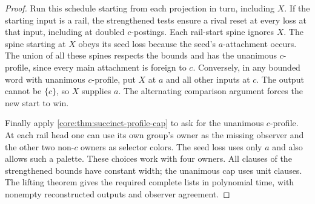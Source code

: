 \begin{proof}
Run this schedule starting from each projection in turn, including
$X$. If the starting input is a rail, the strengthened tests ensure
a rival reset at every loss at that input, including at doubled
$c$-postings. Each rail-start spine ignores $X$. The spine starting
at $X$ obeys its seed loss because the seed's $a$-attachment occurs.
The union of all these spines respects the bounds and has the
unanimous $c$-profile, since every main attachment is foreign to $c$.
Conversely, in any bounded word with unanimous $c$-profile,
put $X$ at $a$ and all other inputs at $c$. The output cannot be
$\{c\}$, so $X$ supplies $a$. The alternating comparison argument
forces the new start to win.

Finally apply \cref{core:thm:succinct-profile-cap} to ask for the
unanimous $c$-profile. At each rail head one can use its own group's
owner as the missing observer and the other two non-$c$ owners
as selector colors. The seed loss uses only $a$ and also allows
such a palette. These choices work with four owners. All clauses
of the strengthened bounds have constant width; the unanimous
cap uses unit clauses. The lifting theorem gives the required
complete lists in polynomial time, with nonempty reconstructed
outputs and observer agreement.
\end{proof}


